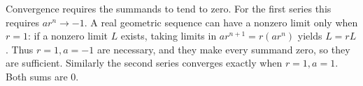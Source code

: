 Convergence requires the summands to tend to zero. For the first series this requires $ar^n\to-1$. A real geometric sequence can have a nonzero limit only when $r=1$: if a nonzero limit $L$ exists, taking limits in $ar^{n+1}=r(ar^n)$ yields $L=rL$. Thus $r=1,a=-1$ are necessary, and they make every summand zero, so they are sufficient. Similarly the second series converges exactly when $r=1,a=1$. Both sums are $\boxed{0}$.
